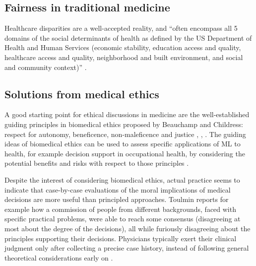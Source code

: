 \subsection{Fairness in traditional medicine}
    Healthcare disparities are a well-accepted reality, and ``often encompass all 5 domains of the social determinants of health as defined by the US Department of Health and Human Services (economic stability, education access and quality, healthcare access and quality, neighborhood and built environment, and social and community context)'' \cite[p.~2]{Chen2021}.


\subsection{Solutions from medical ethics}
    A good starting point for ethical discussions in medicine are the well-established guiding principles in biomedical ethics proposed by Beauchamp and Childress: respect for autonomy, beneficence, non-maleficence and justice \cite{Dijkstra2020}, \cite{Morley2020}, \cite{Rajkomar2018}.
    The guiding ideas of biomedical ethics can be used to assess specific applications of ML to health, for example decision support in occupational health, by considering the potential benefits and risks with respect to those principles \cite{Dijkstra2020}.

    Despite the interest of considering biomedical ethics, actual practice seems to indicate that case-by-case evaluations of the moral implications of medical decisions are more useful than principled approaches.
    Toulmin\cite{Toulmin1982} reports for example how a commission of people from different backgrounds, faced with specific practical problems, were able to reach some consensus (disagreeing at most about the degree of the decisions), all while furiously disagreeing about the principles supporting their decisions.
    Physicians typically exert their clinical judgment only after collecting a precise case history, instead of following general theoretical considerations early on \cite{Toulmin1982}.
